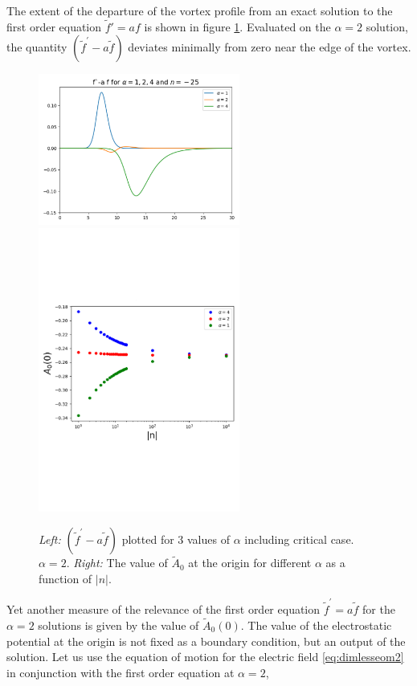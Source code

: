 The extent of the departure of the vortex profile from an exact solution to the  first order equation $\tilde f'=a f$ is shown in figure \ref{fig:error}.  Evaluated on the $\alpha=2$ solution, the quantity $(\tilde f^\prime - a \tilde f)$ deviates minimally from zero near the edge of the vortex.
\begin{figure}[H]
\begin{center}
    \includegraphics[width=2.6in]{Chapter_2_Folder_1912.11321/figures/BPS_equation_error.pdf}\qquad\includegraphics[width=2.6in]{Chapter_2_Folder_1912.11321/figures/negative_n_A0.pdf}
     \caption[Plots of $\tilde{f}(r)' - a(r) \tilde{f}(r)$ for 3 values of $\alpha$ and $\tilde{A}_0(0)$ for different values of $|n|$ and $\alpha$.]{{\small {\it Left: }$\left(\tilde f^\prime - a \tilde f\right)$ plotted for 3 values of $\alpha$ including critical case. $\alpha=2$. {\it Right:} The value of $\tilde A_0$ at the origin for different $\alpha$ as a function of $|n|$. }} \label{fig:error}
    \end{center}
\end{figure}
Yet another measure of the relevance of the first order equation $\tilde f^\prime = a \tilde f$ for the $\alpha=2$ solutions is given by the value of $\tilde A_0(0)$. The value of the electrostatic potential at the origin is not fixed as a boundary condition, but an output of the solution. Let us use the equation of motion for the electric field \eqref{eq:dimlesseom2} in conjunction with the first order equation at $\alpha=2$,
